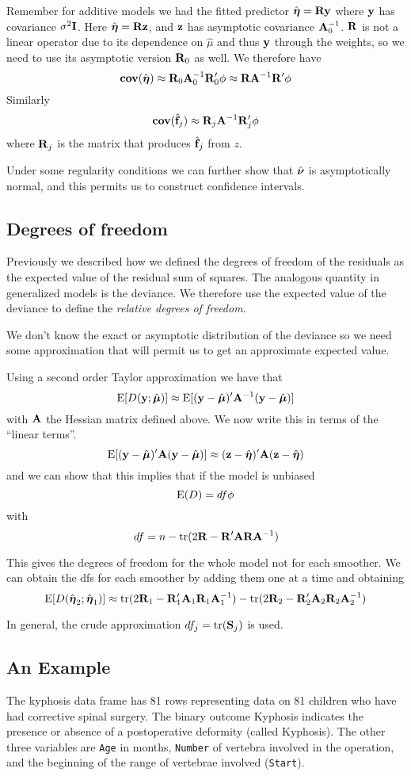 Remember for additive models we had the fitted predictor
$\hat{\mbox{\boldmath $\eta$\unboldmath}} = {\mathbf R}{\mathbf y}$ where ${\mathbf y}$ has covariance
$\sigma^2{\mathbf I}$. Here $\hat{\mbox{\boldmath $\eta$\unboldmath}} = {\mathbf R}{\mathbf z}$, and ${\mathbf z}$ has
asymptotic covariance ${\mathbf A}_0^{-1}$. ${\mathbf R}$ is not a linear operator due
to its dependence on $\hat{\mu}$ and thus ${\mathbf y}$ through the weights,
so we need to use its asymptotic version ${\mathbf R}_0$ as well. We therefore
have
\[
{\bf cov}(\hat{\mbox{\boldmath $\eta$\unboldmath}}) \approx {\mathbf R}_0 {\mathbf A}_0^{-1} {\mathbf R}_0 ' \phi \approx
{\mathbf R} {\mathbf A}^{-1} {\mathbf R}' \phi
\]
Similarly 
\[
{\bf cov}(\hat{{\mathbf f}}_j) \approx {\mathbf R}_j {\mathbf A}^{-1} {\mathbf R}_j' \phi
\]
where ${\mathbf R}_j$ is the matrix that produces $\hat{{\mathbf f}}_j$ from $z$.

Under some regularity conditions we can further show that
$\hat{\mbox{\boldmath $\nu$\unboldmath}}$ is asymptotically normal, and this permits us to
construct confidence intervals.

\subsection{Degrees of freedom}
Previously we described how we defined the degrees of freedom of the
residuals as the expected value of the residual sum of squares. The
analogous quantity in generalized models is the deviance. We therefore
use the expected value of the deviance to define the {\it relative
degrees of freedom}.

We don't know the exact or asymptotic distribution of the deviance so
we need some approximation that will permit us to get an approximate
expected value. 

Using a second order Taylor approximation we have that
\[
\mbox{E}[D({\mathbf y};\hat{\mbox{\boldmath $\mu$\unboldmath}})] \approx \mbox{E}[({\mathbf y} - \hat{\mbox{\boldmath $\mu$\unboldmath}})'{\mathbf A}^{-1} ({\mathbf y} -
\hat{\mbox{\boldmath $\mu$\unboldmath}})]
\]
with ${\mathbf A}$ the Hessian matrix defined above. We now write this in terms of the
``linear terms''.
\[
 \mbox{E}[({\mathbf y} - \hat{\mbox{\boldmath $\mu$\unboldmath}})'{\mathbf A} ({\mathbf y} - \hat{\mbox{\boldmath $\mu$\unboldmath}})] \approx ({\mathbf z} -
 \hat{\mbox{\boldmath $\eta$\unboldmath}})'{\mathbf A} ({\mathbf z} - \hat{\mbox{\boldmath $\eta$\unboldmath}})
\]
and we can show that this implies that if the model is unbiased
\[
\mbox{E}(D) = df \phi
\]
with 
\[
df = n - \mbox{tr}(2{\mathbf R} - {\mathbf R}'{\mathbf A}{\mathbf R}{\mathbf A}^{-1})
\]

This gives the degrees of freedom for the whole model not for each
smoother. We can obtain the dfs for each smoother by adding them one
at a time and obtaining
\[
\mbox{E}[D(\hat{\mbox{\boldmath $\eta$\unboldmath}}_2;\hat{\mbox{\boldmath $\eta$\unboldmath}}_1)] \approx \mbox{tr}(2{\mathbf R}_1 -
{\mathbf R}_1'{\mathbf A}_1{\mathbf R}_1{\mathbf A}_1^{-1}) - \mbox{tr}( 2{\mathbf R}_2 - {\mathbf R}_2'{\mathbf A}_2{\mathbf R}_2{\mathbf A}_2^{-1})
\]

In general, the crude approximation $df_j = \mbox{tr}({\mathbf S}_j)$ is used.

\subsection{An Example}
 The kyphosis data frame has 81 rows representing  data on
 81  children  who have had corrective spinal surgery.  The binary
 outcome Kyphosis indicates the presence or absence of a postoperative
 deformity (called Kyphosis). The other three 
 variables are {\tt Age} in months, {\tt Number} of vertebra involved in the
 operation, and  the beginning of the range of vertebrae involved
 ({\tt Start}). 
 

